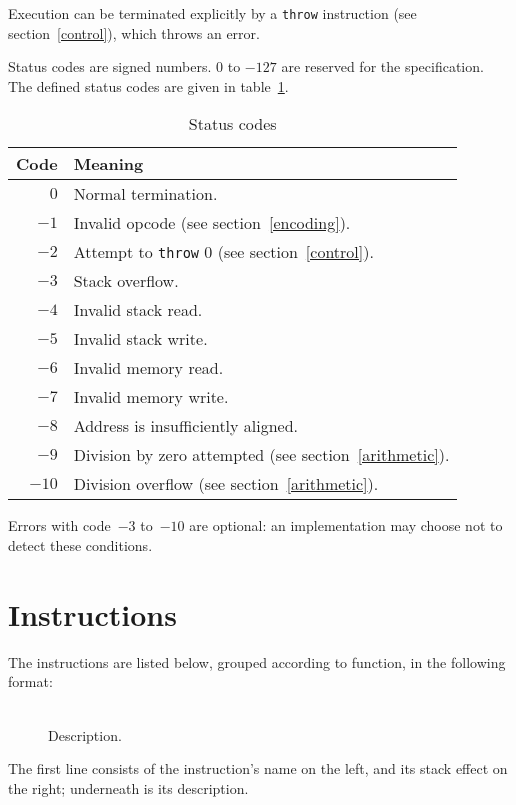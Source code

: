 \documentclass[a4paper]{article}
\newcommand{\spic}[1]{\texttt{\slshape{#1\/}}}
\newlength{\itemwidth}\itemwidth=\textwidth \advance\itemwidth by -0.1in
\newlength{\instname}\instname=0.8in
\newlength{\stackcom}\stackcom=3.7in
\newcommand{\instprim}[3]{\item[]\parbox{\itemwidth}%
{\makebox[\instname][l]{\tt #1}%
\makebox[\stackcom][r]{\spic{\pbox[t]{\stackcom}{#2}}}\\[0.5ex]#3}}
\newcommand{\inst}[4]{\instprim{#1}{\tt …#2 → …#3}{#4}}
\begin{document}
Execution can be terminated explicitly by a {\tt throw} instruction (see section~\ref{control}), which throws an error.

Status codes are signed numbers. $0$ to $-127$ are reserved for the specification. The defined status codes are given in table~\ref{statustable}.

\begin{table}[htb]
\begin{center}
\begin{tabular}{rp{4in}} \toprule
\bf Code & \bf Meaning \\ \midrule
$0$ & Normal termination. \\
$-1$ & Invalid opcode (see section~\ref{encoding}). \\
$-2$ & Attempt to {\tt throw} $0$ (see section~\ref{control}). \\
$-3$ & Stack overflow. \\
$-4$ & Invalid stack read. \\
$-5$ & Invalid stack write. \\
$-6$ & Invalid memory read. \\
$-7$ & Invalid memory write. \\
$-8$ & Address is insufficiently aligned. \\
$-9$ & Division by zero attempted (see section~\ref{arithmetic}). \\
$-10$ & Division overflow (see section~\ref{arithmetic}). \\
 \bottomrule
\end{tabular}
\caption{\label{statustable}Status codes}
\end{center}
\end{table}

\noindent Errors with code~$-3$ to~$-10$ are optional: an implementation may choose not to detect these conditions.


\section{Instructions}

The instructions are listed below, grouped according to function, in the following format:

\begin{description}
\inst{NAME}{before}{after}{Description.}
\end{description}

\noindent The first line consists of the instruction’s name on the left, and its stack effect on the right; underneath is its description.
\end{document}
